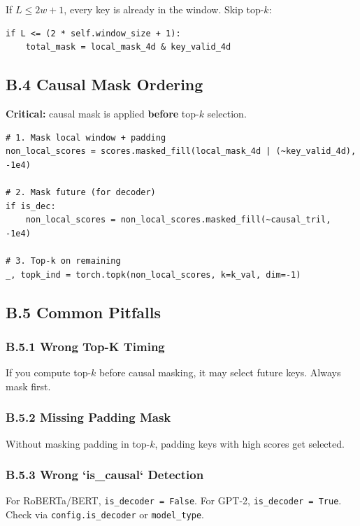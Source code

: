 If $L \leq 2w + 1$, every key is already in the window. Skip top-$k$:

\begin{lstlisting}
if L <= (2 * self.window_size + 1):
    total_mask = local_mask_4d & key_valid_4d
\end{lstlisting}

\subsection{B.4 Causal Mask Ordering}

\textbf{Critical:} causal mask is applied \textbf{before} top-$k$ selection.

\begin{lstlisting}
# 1. Mask local window + padding
non_local_scores = scores.masked_fill(local_mask_4d | (~key_valid_4d), -1e4)

# 2. Mask future (for decoder)
if is_dec:
    non_local_scores = non_local_scores.masked_fill(~causal_tril, -1e4)

# 3. Top-k on remaining
_, topk_ind = torch.topk(non_local_scores, k=k_val, dim=-1)
\end{lstlisting}

\subsection{B.5 Common Pitfalls}

\subsubsection{B.5.1 Wrong Top-K Timing}

If you compute top-$k$ before causal masking, it may select future keys. 
Always mask first.

\subsubsection{B.5.2 Missing Padding Mask}

Without masking padding in top-$k$, padding keys with high scores get 
selected.

\subsubsection{B.5.3 Wrong `is\_causal` Detection}

For RoBERTa/BERT, \texttt{is\_decoder = False}. For GPT-2, \texttt{is\_decoder = True}. 
Check via \texttt{config.is\_decoder} or \texttt{model\_type}.

